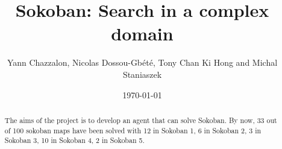 \documentclass[a4paper,11pt]{article}
\title{Sokoban: Search in a complex domain}
\author{Yann Chazzalon,  Nicolas Dossou-Gb{\'e}t{\'e}, Tony Chan Ki Hong and Michal Staniaszek}
\date{\today}
\begin{document}
\maketitle

\begin{abstract}
The aims of the project is to develop an agent that can solve Sokoban. By now, 33 out of 100 sokoban maps have been solved with 12 in Sokoban 1, 6 in Sokoban 2, 3 in Sokoban 3, 10 in Sokoban 4, 2 in Sokoban 5.

\end{abstract}

\begin{figure}[!ht]
  \captionsetup[subfigure]{labelformat=empty}
  \centering
  \quad
  \quad
  \quad
\end{figure}
\end{document}
